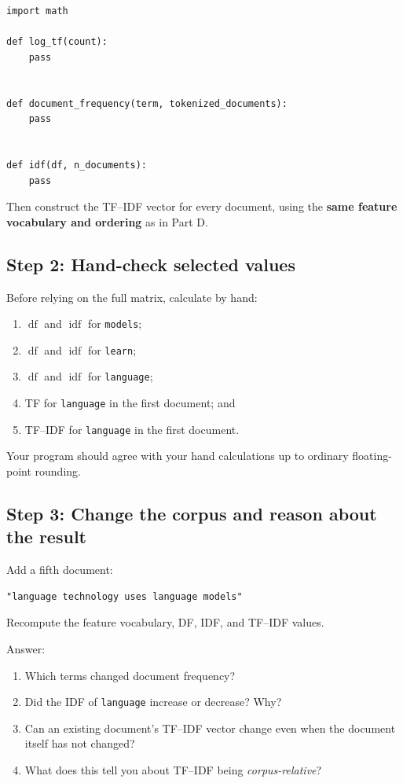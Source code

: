 \documentclass[11pt,a4paper]{article}
\begin{document}
\begin{lstlisting}
import math

def log_tf(count):
    pass


def document_frequency(term, tokenized_documents):
    pass


def idf(df, n_documents):
    pass
\end{lstlisting}

Then construct the TF--IDF vector for every document, using the \textbf{same feature vocabulary and ordering} as in Part D.

\subsection{Step 2: Hand-check selected values}

Before relying on the full matrix, calculate by hand:

\begin{enumerate}
  \item $\operatorname{df}$ and $\operatorname{idf}$ for \texttt{models};
  \item $\operatorname{df}$ and $\operatorname{idf}$ for \texttt{learn};
  \item $\operatorname{df}$ and $\operatorname{idf}$ for \texttt{language};
  \item TF for \texttt{language} in the first document; and
  \item TF--IDF for \texttt{language} in the first document.
\end{enumerate}

Your program should agree with your hand calculations up to ordinary floating-point rounding.

\subsection{Step 3: Change the corpus and reason about the result}

Add a fifth document:

\begin{lstlisting}
"language technology uses language models"
\end{lstlisting}

Recompute the feature vocabulary, DF, IDF, and TF--IDF values.

Answer:

\begin{enumerate}
  \item Which terms changed document frequency?
  \item Did the IDF of \texttt{language} increase or decrease? Why?
  \item Can an existing document's TF--IDF vector change even when the document itself has not changed?
  \item What does this tell you about TF--IDF being \emph{corpus-relative}?
\end{enumerate}
\end{document}
